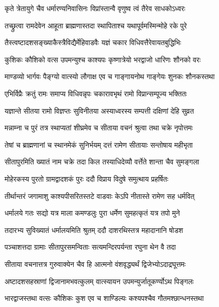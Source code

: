 \twolineshloka
{कृते त्रेतायुगे चैव धर्मारण्यनिवासिनः}
{विप्रांस्तान्वै वृणुष्व त्वं तैरेव साधकोऽध्वरः}%

\twolineshloka
{तच्छ्रुत्वा रामदेवेन आहूता ब्राह्मणास्तदा}
{स्थापिताश्च यथापूर्वमस्मिन्मोहे रके पुरे}%

\twolineshloka
{तैस्त्वष्टादशसङ्ख्याकैस्त्रैविद्यैर्मेहिवाडवैः}
{यज्ञं चकार विधिवत्तैरेवायतबुद्धिभिः}%

\twolineshloka
{कुशिकः कौशिको वत्स उपमन्युश्च काश्यपः}
{कृष्णात्रेयो भरद्वाजो धारिणः शौनको वरः}%

\twolineshloka
{माण्डव्यो भार्गवः पैङ्ग्यो वात्स्यो लौगाक्ष एव च}
{गाङ्गायनोथ गाङ्गेयः शुनकः शौनकस्तथा}%


\twolineshloka
{एभिर्विप्रैः क्रतुं रामः समाप्य विधिवन्नृपः}
{चकारावभृथं रामो विप्रान्सम्पूज्य भक्तितः}%

\twolineshloka
{यज्ञान्ते सीतया रामो विज्ञप्तः सुविनीतया}
{अस्याध्वरस्य सम्पत्ती दक्षिणां देहि सुव्रत}%

\twolineshloka
{मन्नाम्ना च पुरं तत्र स्थाप्यतां शीघ्रमेव च}
{सीताया वचनं श्रुत्वा तथा चक्रे नृपोत्तमः}%

\twolineshloka
{तेषां च ब्राह्मणानां च स्थानमेकं सुनिर्भयम्}
{दत्तं रामेण सीतायाः सन्तोषाय महीभृता}%

\twolineshloka
{सीतापुरमिति ख्यातं नाम चक्रे तदा किल}
{तस्याधिदेव्यौ वर्त्तेते शान्ता चैव सुमङ्गला}%

\twolineshloka
{मोहेरकस्य पुरतो ग्रामद्वादशकं पुरः}
{ददौ विप्राय विदुषे समुत्थाय प्रहर्षितः}%

\twolineshloka
{तीर्थान्तरं जगामाशु काश्यपीसरितस्तटे}
{वाडवाः केऽपि नीतास्ते रामेण सह धर्मवित्}%

\twolineshloka
{धर्मालये गतः सद्यो यत्र माला कमण्डलुः}
{पुरा धर्मेण सुमहत्कृतं यत्र तपो मुने}%

\twolineshloka
{तदारभ्य सुविख्यातं धर्मालयमिति श्रुतम्}
{ददौ दाशरथिस्तत्र महादानानि षोडश}%

\twolineshloka
{पञ्चाशत्तदा ग्रामाः सीतापुरसमन्विताः}
{सत्यमन्दिरपर्यन्ता रघुना थेन वै तदा}%

\twolineshloka
{सीताया वचनात्तत्र गुरुवाक्येन चैव हि}
{आत्मनो वंशवृद्ध्यर्थं द्विजेभ्योऽदाद्रघूत्तमः}%

\twolineshloka
{अष्टादशसहस्राणां द्विजानामभवत्कुलम्}
{वात्स्यायन उपमन्युर्जातूकर्ण्योऽथ पिङ्गलः}%

\twolineshloka
{भारद्वाजस्तथा वत्सः कौशिकः कुश एव च}
{शाण्डिल्यः कश्यपश्चैव गौतमश्छान्धनस्तथा}%

